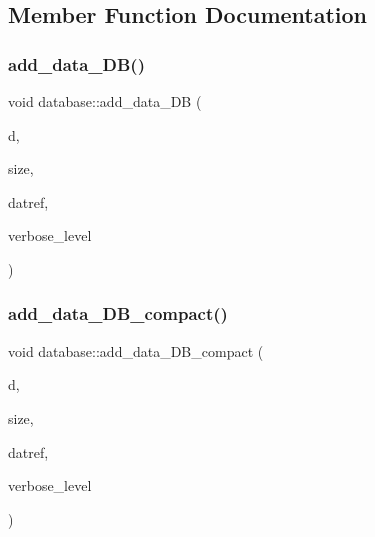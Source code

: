 \subsection{Member Function Documentation}
\mbox{\label{classdatabase_ab1a4122dfc06c6e79343fda437c05ed5}} 
\subsubsection{\texorpdfstring{add\+\_\+data\+\_\+\+D\+B()}{add\_data\_DB()}}
{\footnotesize\ttfamily void database\+::add\+\_\+data\+\_\+\+DB (\begin{DoxyParamCaption}\item[{void $\ast$}]{d,  }\item[{\mbox{\hyperlink{galois_8h_a09fddde158a3a20bd2dcadb609de11dc}{I\+NT}}}]{size,  }\item[{\mbox{\hyperlink{galois_8h_ac94af6544c710549c9fca744fd510395}{U\+I\+N\+T4}} $\ast$}]{datref,  }\item[{\mbox{\hyperlink{galois_8h_a09fddde158a3a20bd2dcadb609de11dc}{I\+NT}}}]{verbose\+\_\+level }\end{DoxyParamCaption})}

\mbox{\label{classdatabase_a31e32de1b8d81c97549b8c74ea678904}} 
\subsubsection{\texorpdfstring{add\+\_\+data\+\_\+\+D\+B\+\_\+compact()}{add\_data\_DB\_compact()}}
{\footnotesize\ttfamily void database\+::add\+\_\+data\+\_\+\+D\+B\+\_\+compact (\begin{DoxyParamCaption}\item[{void $\ast$}]{d,  }\item[{\mbox{\hyperlink{galois_8h_a09fddde158a3a20bd2dcadb609de11dc}{I\+NT}}}]{size,  }\item[{\mbox{\hyperlink{galois_8h_ac94af6544c710549c9fca744fd510395}{U\+I\+N\+T4}} $\ast$}]{datref,  }\item[{\mbox{\hyperlink{galois_8h_a09fddde158a3a20bd2dcadb609de11dc}{I\+NT}}}]{verbose\+\_\+level }\end{DoxyParamCaption})}

